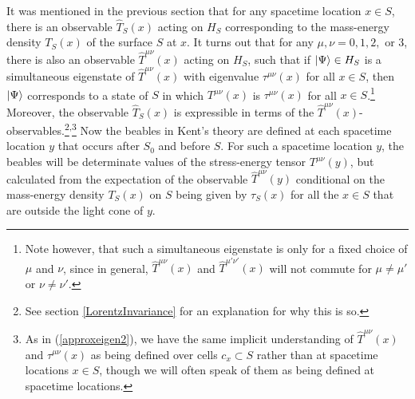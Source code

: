 It was mentioned in the previous section that for any spacetime location $x\in S$,  there is an observable $\hat{T}_S(x)$ acting on $H_S$ corresponding to the mass-energy density $T_S(x)$ of the surface $S$ at $x$. It turns out that for any $\mu, \nu=0,1,2,$ or $3$, there is also an observable  $\hat{T}^{\mu\nu}(x)$ acting  %
%
 on $H_S$, such that if $\ket{\Psi}\in H_S$ is a simultaneous eigenstate of $\hat{T}^{\mu\nu}(x)$ with eigenvalue $\tau^{\mu\nu}(x)$ for  %
%
 all $x\in S$, then $\ket{\Psi}$ corresponds to a state of $S$ in which $T^{\mu\nu}(x)$ is  $\tau^{\mu\nu}(x)$ for all $x\in S$.\footnote{Note however, that such a simultaneous eigenstate is only for a fixed choice of $\mu$ and $\nu$, since in general, $\hat{T}^{\mu\nu}(x)$ and $\hat{T}^{\mu'\nu'}(x)$ will not commute for $\mu\neq\mu'$ or $\nu\neq\nu'$. } Moreover, the observable $\hat{T}_S(x)$ is expressible in terms of the  $\hat{T}^{\mu\nu}(x)$-observables.\footnote{See section  \ref{LorentzInvariance} for an explanation for why this is so.}\textsuperscript{,}\footnote{As in (\ref{approxeigen2}), we have the same implicit understanding of $\hat{T}^{\mu\nu}(x)$ and $\tau^{\mu\nu}(x)$ as being defined over cells $c_x\subset S$ rather than at spacetime locations $x\in S$, though we will often speak of them as being defined at spacetime locations. }
Now the  beables in Kent's theory are defined at each spacetime location $y$ that occurs after $S_0$ and before $S$. For such a spacetime location $y$, the beables will be determinate values of the stress-energy tensor $T^{\mu\nu}(y)$, but calculated from the expectation of the observable $\hat{T}^{\mu\nu}(y)$ conditional on the mass-energy density $T_S(x)$ on $S$ being given by $\tau_S(x)$ for all the $x\in S$ that are outside the light cone of $y$. 

